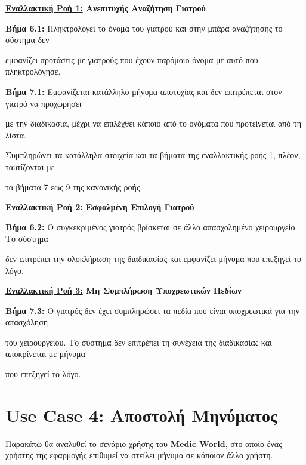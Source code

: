 \documentclass{article}
\begin{document}
  \textbf{\underline{Εναλλακτική Ροή 1:} Ανεπιτυχής Αναζήτηση Γιατρού} \vspace{0.2cm} 
\par \textbf{Βήμα 6.1:} Πληκτρολογεί το όνομα του γιατρού και στην μπάρα αναζήτησης το σύστημα δεν \par εμφανίζει προτάσεις με γιατρούς που έχουν παρόμοιο όνομα με αυτό που πληκτρολόγησε. \vspace{0.1cm}
\par \textbf{Βήμα 7.1:} Εμφανίζεται κατάλληλο μήνυμα αποτυχίας και δεν επιτρέπεται στον γιατρό να προχωρήσει \par με την διαδικασία, μέχρι να επιλέχθει κάποιο από το ονόματα που προτείνεται από τη λίστα.\vspace{0.1cm}
\par Συμπληρώνει τα κατάλληλα στοιχεία και τα βήματα της εναλλακτικής ροής 1, πλέον, ταυτίζονται με \par τα βήματα 7 εως 9 της κανονικής ροής. \vspace{0.2cm}

\textbf{\underline{Εναλλακτική Ροή 2:} Εσφαλμένη Επιλογή Γιατρού} \vspace{0.2cm} 

\par \textbf{Βήμα 6.2:} Ο συγκεκριμένος γιατρός βρίσκεται σε άλλο απασχολημένο χειρουργείο. Το σύστημα \par δεν επιτρέπει την ολοκλήρωση της διαδικασίας και εμφανίζει μήνυμα που επεξηγεί το λόγο. \vspace{0.2cm}

\textbf{\underline{Εναλλακτική Ροή 3:} Μη Συμπλήρωση Υποχρεωτικών Πεδίων} \vspace{0.2cm} 
\par \textbf{Βήμα 7.3:} Ο γιατρός δεν έχει συμπληρώσει τα πεδία που είναι υποχρεωτικά για την απασχόληση \par του χειρουργείου. Το σύστημα δεν επιτρέπει τη συνέχεια της διαδικασίας και αποκρίνεται με μήνυμα \par που επεξηγεί το λόγο.\vspace{0.2cm}

\section{Use Case 4: Αποστολή Μηνύματος}

Παρακάτω θα αναλυθεί το σενάριο χρήσης του \textbf{Medic World}, στο οποίο ένας χρήστης της εφαρμογής επιθυμεί να στείλει μήνυμα σε κάποιον άλλο χρήστη.
\end{document}
